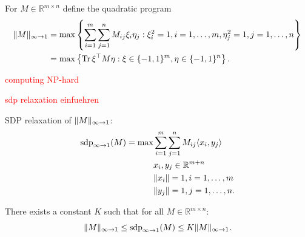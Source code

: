 \begin{dfn}
	For $M\in\mathbb{R}^{m\times n}$ define the quadratic program
	\begin{align}
		 \Vert {M} \Vert_{\infty\to 1} &= \max \left\{ \sum_{i=1}^m \sum_{j=1}^n M_{ij} \xi_i \eta_j : \xi_i^2=1, i=1,\dots,m, \eta_j^2=1, j =1,\dots,n \right\} \\
		&=\max\left\{\text{Tr} \, {\xi^\top M \eta} : \xi\in\{-1,1\}^m,\eta\in\{-1,1\}^n\right\}.
	\end{align}
\end{dfn}
\textcolor{red}{computing NP-hard}
\begin{dfn}
	\textcolor{red}{sdp relaxation einfuehren}
	
	SDP relaxation of $ \Vert {M} \Vert_{\infty\to1}$:
	\begin{align*}
		\operatorname{sdp}_{\infty\to 1} (M) = \max 
		&\sum_{i=1}^m\sum_{j=1}^n M_{ij} \langle{x_i},{y_j}\rangle\\
		&x_i,y_j\in\mathbb{R}^{m+n}\\
		& \Vert {x_i} \Vert=1, i=1,\dots,m\\
		& \Vert {y_j} \Vert=1, j=1,\dots,n.
	\end{align*}
\end{dfn}
\begin{theo} \label{theo:G_ineq}
	There exists a constant $K$ such that for all $M\in\mathbb{R}^{m\times n}$:
	\begin{equation}
		 \Vert {M} \Vert_{\infty\to 1} \leq \operatorname{sdp}_{\infty\to 1} (M) \leq K  \Vert {M} \Vert_{\infty\to 1}.
	\end{equation}
\end{theo}
